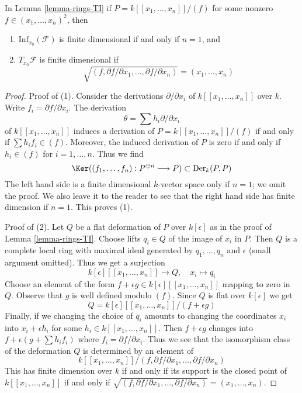 \begin{lemma}
\label{lemma-power-series-rings-TI}
In Lemma \ref{lemma-rings-TI} if $P = k[[x_1, \ldots, x_n]]/(f)$
for some nonzero $f \in (x_1, \ldots, x_n)^2$, then
\begin{enumerate}
\item $\text{Inf}_{x_0}(\mathcal{F})$ is finite dimensional
if and only if $n = 1$, and
\item $T_{x_0}\mathcal{F}$ is finite dimensional if
$$
\sqrt{(f, \partial f/\partial x_1, \ldots,  \partial f/\partial x_n)} =
(x_1, \ldots, x_n)
$$
\end{enumerate}
\end{lemma}

\begin{proof}
Proof of (1). Consider the derivations $\partial/\partial x_i$ of
$k[[x_1, \ldots, x_n]]$ over $k$. Write $f_i = \partial f/\partial x_i$.
The derivation
$$
\theta = \sum h_i \partial/\partial x_i
$$
of $k[[x_1, \ldots, x_n]]$
induces a derivation of $P = k[[x_1, \ldots, x_n]]/(f)$
if and only if
$\sum h_i f_i \in (f)$. Moreover, the induced derivation of $P$
is zero if and only if $h_i \in (f)$ for $i = 1, \ldots, n$.
Thus we find
$$
\Ker((f_1, \ldots, f_n) : P^{\oplus n} \longrightarrow P) \subset
\text{Der}_k(P, P)
$$
The left hand side is a finite dimensional $k$-vector space only if
$n = 1$; we omit the proof. We also leave it to the reader to see
that the right hand side has finite dimension if $n = 1$.
This proves (1).

\medskip\noindent
Proof of (2). Let $Q$ be a flat deformation of $P$ over $k[\epsilon]$
as in the proof of Lemma \ref{lemma-rings-TI}. Choose lifts $q_i \in Q$
of the image of $x_i$ in $P$. Then $Q$ is a complete local ring
with maximal ideal generated by $q_1, \ldots, q_n$ and $\epsilon$
(small argument omitted). Thus we get a surjection
$$
k[\epsilon][[x_1, \ldots, x_n]] \longrightarrow Q,\quad
x_i \longmapsto q_i
$$
Choose an element of the form
$f + \epsilon g \in k[\epsilon][[x_1, \ldots, x_n]]$
mapping to zero in $Q$. Observe that $g$ is well defined modulo $(f)$.
Since $Q$ is flat over $k[\epsilon]$ we get
$$
Q = k[\epsilon][[x_1, \ldots, x_n]]/(f + \epsilon g)
$$
Finally, if we changing the choice of $q_i$ amounts to
changing the coordinates $x_i$ into $x_i + \epsilon h_i$
for some $h_i \in k[[x_1, \ldots, x_n]]$. Then
$f + \epsilon g$ changes into $f + \epsilon (g + \sum h_i f_i)$
where $f_i = \partial f/\partial x_i$. Thus we see that the
isomorphism class of the deformation $Q$ is determined
by an element of
$$
k[[x_1, \ldots, x_n]]/
(f, \partial f/\partial x_1, \ldots,  \partial f/\partial x_n)
$$
This has finite dimension over $k$ if and only if
its support is the closed point of $k[[x_1, \ldots, x_n]]$
if and only if
$\sqrt{(f, \partial f/\partial x_1, \ldots,  \partial f/\partial x_n)} =
(x_1, \ldots, x_n)$.
\end{proof}







